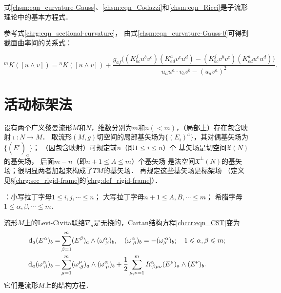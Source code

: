 式\eqref{chsm:eqn_curvature-Gauss}、\eqref{chsm:eqn_Codazzi}和\eqref{chsm:eqn_Ricci}是子流形理论中的基本方程式．


参考式\eqref{chrg:eqn_sectional-curvature}，
由式\eqref{chsm:eqn_curvature-Gauss-0}可得到截面曲率间的关系式：
\begin{small}
\setlength{\mathindent}{0em}
\begin{equation}    \label{chsm:eqn_NM-sect-curv}
      {}^m K([u\wedge v]) ={}^n K([u\wedge v])
    + \frac{{g}_{af} \bigl( 
    (K^f_{bc} u^b v^c) (K^a_{ed} v^e u^d)
    -(K^f_{bc} v^b v^c) (K^a_{ed} u^e u^d) 
    \bigr)}
    {{u}_a{u}^a \cdot {v}_b{v}^b - ({u}_a{v}^a)^2 }  .
\end{equation}\setlength{\mathindent}{2em}
\end{small}


\section{活动标架法}\label{chsm:sec_Frame}
设有两个广义黎曼流形$M$和$N$，维数分别为$m$和$n(<m)$，（局部上）存在包含映射$\imath:N\to M$．
取流形$({M},{g})$切空间的局部基矢场为$\{(E_i)^a\}$，其对偶基矢场为$\{(E^i)_a\}$；
（因包含映射）可规定前$n$（即$1\leqslant i \leqslant n$）个
基矢场是切空间$\mathfrak{X}(N)$的基矢场，
后面$m-n$（即$n+1\leqslant A \leqslant {m}$）个基矢场
是法空间$\mathfrak{X}^\bot (N)$的基矢场；很明显两者加起来构成了$TM$的基矢场．
再规定这些基矢场是标架场
（定义见\S\ref{chrg:sec_rigid-frame}的\ref{chrg:def_rigid-frame}）．

：小写拉丁字母$1 \leqslant i,j,\cdots \leqslant n$；
大写拉丁字母$n+1 \leqslant A,B,\cdots \leqslant m$；
希腊字母$1 \leqslant \alpha,\beta,\cdots \leqslant m$．


流形$M$上的Levi-Civita联络$\nabla_a$是无挠的，Cartan结构方程\eqref{chccr:eqn_CST}变为
\begin{subequations}\label{chsm:eqn_CST-M}
    \begin{align}
        {\rm d}_a (E^\alpha)_b =&\sum_{\beta=1}^{m}(E^\beta)_a \wedge (\omega _{\cdot \beta}^\alpha)_b ,
        \quad (\omega _{\cdot \beta}^\alpha)_b =-(\omega ^{\cdot \alpha}_{ \beta})_b ;
        \quad 1 \leqslant \alpha,\beta \leqslant m; \label{chsm:eqn_CST-M-I}\\
        {\rm d}_a ( \omega _{\cdot \beta} ^\alpha  )_b  =& \sum_{\mu=1}^{m} ( \omega _{\cdot \beta}^\mu )_a
        \wedge ( \omega _{\cdot \mu}^\alpha )_b + \frac{1}{2}\sum_{\mu,\nu=1}^{m}R_{\cdot \beta\mu\nu}^\alpha
        (E^\mu)_a \wedge (E^\nu)_b. \label{chsm:eqn_CST-M-II} %
    \end{align}
\end{subequations}
它们是流形$M$上的结构方程．


